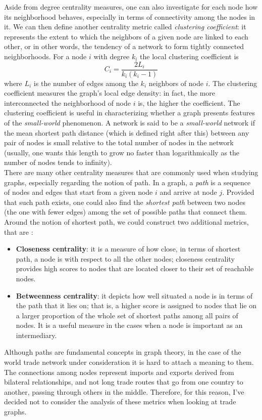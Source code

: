 Aside from degree centrality measures, one can also investigate for each node how its neighborhood behaves, especially in terms of connectivity among the nodes in it. We can then define another centrality metric called \textit{clustering coefficient}: it represents the extent to which the neighbors of a given node are linked to each other, or in other words, the tendency of a network to form tightly connected neighborhoods. For a node $i$ with degree $k_i$ the local clustering coefficient is
\begin{equation}\label{eq:clustering}
    C_i = \frac{2 L_i}{k_i(k_i-1)}
\end{equation}
where $L_i$ is the number of edges among the $k_i$ neighbors of node $i$. The clustering coefficient measures the graph's local edge density: in fact, the more interconnected the neighborhood of node $i$ is, the higher the coefficient. The clustering coefficient is useful in characterizing whether a graph presents features of the \textit{small-world} phenomenon. A network is said to be a \textit{small-world} network if the mean shortest path distance (which is defined right after this) between any pair of nodes is small relative to the total number of nodes in the network (usually, one wants this length to grow no faster than logarithmically as the number of nodes tends to infinity).\\
There are many other centrality measures that are commonly used when studying graphs, especially regarding the notion of path. In a graph, a \textit{path} is a sequence of nodes and edges that start from a given node $i$ and arrive at node $j$. Provided that such path exists, one could also find the \textit{shortest path} between two nodes (the one with fewer edges) among the set of possible paths that connect them. Around the notion of shortest path, we could construct two additional metrics, that are \cite{benedictis2014bacicepii}:
\begin{itemize}
    \item \textbf{Closeness centrality}: it is a measure of how close, in terms of shortest path, a node is with respect to all the other nodes; closeness centrality provides high scores to nodes that are located closer to their set of reachable nodes.
    \item \textbf{Betweenness centrality}: it depicts how well situated a node is in terms of the path that it lies on; that is, a higher score is assigned to nodes that lie on a larger proportion of the whole set of shortest paths among all pairs of nodes. It is a useful measure in the cases when a node is important as an intermediary.
\end{itemize}
Although paths are fundamental concepts in graph theory, in the case of the world trade network under consideration it is hard to attach a meaning to them. The connections among nodes represent imports and exports derived from bilateral relationships, and not long trade routes that go from one country to another, passing through others in the middle. Therefore, for this reason, I've decided not to consider the analysis of these metrics when looking at trade graphs.



